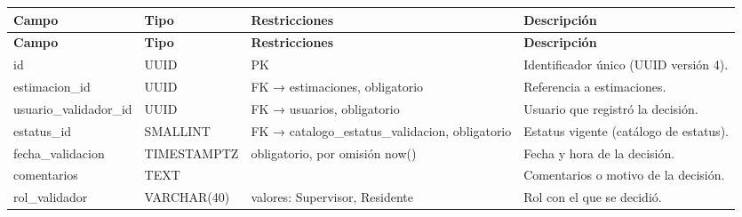 \begin{xltabular}{\linewidth}{@{}>{\ttfamily\footnotesize}p{4.9cm}>{\ttfamily\footnotesize}p{2.4cm}>{\raggedright\arraybackslash\footnotesize}p{3.3cm}>{\footnotesize}X@{}}
\toprule\normalfont\sffamily\bfseries\footnotesize Campo & \normalfont\sffamily\bfseries\footnotesize Tipo & \sffamily\bfseries Restricciones & \sffamily\bfseries Descripción\\\midrule\endfirsthead
\toprule\normalfont\sffamily\bfseries\footnotesize Campo & \normalfont\sffamily\bfseries\footnotesize Tipo & \sffamily\bfseries Restricciones & \sffamily\bfseries Descripción\\\midrule\endhead
\bottomrule\endfoot
id & UUID & PK & Identificador único (UUID versión 4).\\
estimacion\_id & UUID & FK → estimaciones, obligatorio & Referencia a estimaciones.\\
usuario\_validador\_id & UUID & FK → usuarios, obligatorio & Usuario que registró la decisión.\\
estatus\_id & SMALLINT & FK → catalogo\_estatus\_validacion, obligatorio & Estatus vigente (catálogo de estatus).\\
fecha\_validacion & TIMESTAMPTZ & obligatorio, por omisión now() & Fecha y hora de la decisión.\\
comentarios & TEXT &  & Comentarios o motivo de la decisión.\\
rol\_validador & VARCHAR(40) & valores: Supervisor, Residente & Rol con el que se decidió.\\
\end{xltabular}

